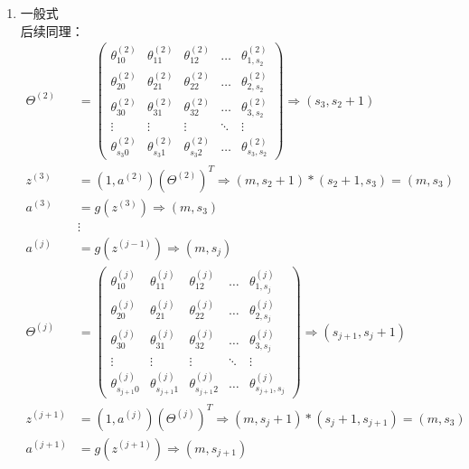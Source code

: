 \begin{enumerate}
\item 一般式 \\
后续同理：
\begin{equation}\begin{aligned}
	\Theta^{(2)} &= 
		\left(\begin{matrix}
			\theta_{10}^{(2)} & \theta_{11}^{(2)} & \theta_{12}^{(2)} & \dots & \theta_{1,s_2}^{(2)} \\
			\theta_{20}^{(2)} & \theta_{21}^{(2)} & \theta_{22}^{(2)} & \dots & \theta_{2,s_2}^{(2)} \\
			\theta_{30}^{(2)} & \theta_{31}^{(2)} & \theta_{32}^{(2)} & \dots & \theta_{3,s_2}^{(2)} \\
			\vdots    & \vdots    & \vdots    & \ddots & \vdots   \\
			\theta_{s_{3}0}^{(2)} & \theta_{s_{3}1}^{(2)} & \theta_{s_{3}2}^{(2)} & \dots & \theta_{s_{3},s_{2}}^{(2)}
		\end{matrix}\right) \Rightarrow {(s_{3},s_2+1)}\\
	z^{(3)} &= (1, a^{(2)}) (\Theta^{(2)})^T \Rightarrow (m,s_2+1) * (s_2+1, s_3) = (m,s_3) \\
	a^{(3)} &= g(z^{(3)}) \Rightarrow {(m,s_3)} \\
	& \vdots \\
	a^{(j)} &= g(z^{(j-1)}) \Rightarrow {(m,s_j)} \\
	\Theta^{(j)} &= 
		\left(\begin{matrix}
			\theta_{10}^{(j)} & \theta_{11}^{(j)} & \theta_{12}^{(j)} & \dots & \theta_{1,s_{j}}^{(j)} \\
			\theta_{20}^{(j)} & \theta_{21}^{(j)} & \theta_{22}^{(j)} & \dots & \theta_{2,s_{j}}^{(j)} \\
			\theta_{30}^{(j)} & \theta_{31}^{(j)} & \theta_{32}^{(j)} & \dots & \theta_{3,s_{j}}^{(j)} \\
			\vdots    & \vdots    & \vdots    & \ddots & \vdots   \\
			\theta_{s_{j+1}0}^{(j)} & \theta_{s_{j+1}1}^{(j)} & \theta_{s_{j+1}2}^{(j)} & \dots & \theta_{s_{j+1},s_{j}}^{(j)}
		\end{matrix}\right) \Rightarrow {(s_{j+1},s_{j}+1)}\\
	z^{(j+1)} &= (1, a^{(j)}) (\Theta^{(j)})^T \Rightarrow (m,s_j+1) * (s_j+1, s_{j+1}) = (m,s_3) \\
	a^{(j+1)} &= g(z^{(j+1)})  \Rightarrow {(m,s_{j+1})} 
\end{aligned}\end{equation}
\end{enumerate}

